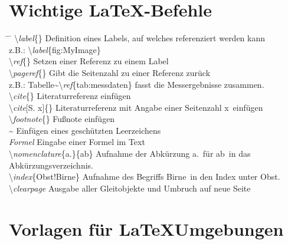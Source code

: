 \setcounter{chapter}{5}
\setcounter{section}{0}
\setcounter{table}{0}
\setcounter{figure}{0}

\section{Wichtige \LaTeX -Befehle}

\begin{tabbing}
\hspace*{0cm} \= \hspace{0.28\linewidth} \= \+\kill
\textbackslash \textit{label}\{\}	\> Definition eines Labels, auf welches referenziert werden kann\\ 
	\> z.B.: \textbackslash \textit{label}\{fig:MyImage\}\\ 
\textbackslash \textit{ref}\{\}	\> Setzen einer Referenz zu einem Label\\
\textbackslash \textit{pageref}\{\}	\> Gibt die Seitenzahl zu einer Referenz zurück\\
	\> z.B.: Tabelle\~{}\textbackslash \textit{ref}\{tab:messdaten\} fasst die Messergebnisse zusammen.\\ 
\textbackslash \textit{cite}\{\}	\> Literaturreferenz einfügen\\
\textbackslash \textit{cite}[S. x]\{\}	\> Literaturreferenz mit Angabe einer Seitenzahl \glqq x\grqq~einfügen\\

\textbackslash \textit{footnote}\{\}	\> Fußnote einfügen\\ 
\~{}	\> Einfügen eines geschützten Leerzeichens\\ 
\textdollar \textit{Formel} \textdollar	\> Eingabe einer Formel im Text\\
\textbackslash \textit{nomenclature}\{a.\}\{ab\}	\> Aufnahme der Abkürzung \glqq a.\grqq~für \glqq ab\grqq~in das Abkürzungsverzeichnis.\\
\textbackslash \textit{index}\{Obst!Birne\} \> Aufnahme des Begriffs \glqq Birne\grqq~in den Index unter \glqq Obst\grqq.  \\
\textbackslash \textit{clearpage}	\> Ausgabe aller Gleitobjekte und Umbruch auf neue Seite\\ 
\end{tabbing}

\clearpage

\section{Vorlagen für \LaTeX Umgebungen}


